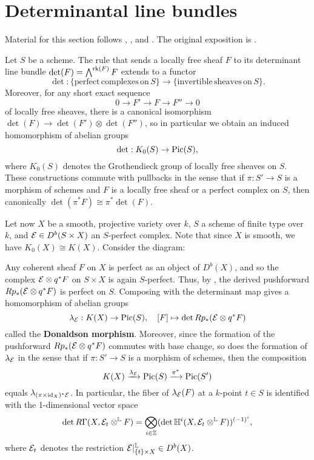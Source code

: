\section{Determinantal line bundles}\label{section:determinantal}
Material for this section follows \cite[\href{https://stacks.math.columbia.edu/tag/0FJI}{Tag 0FJI}]{stacks-project}, \cite[\href{https://stacks.math.columbia.edu/tag/0FJW}{Tag 0FJW}]{stacks-project}, and \cite[Section 8.1]{HL}. The original exposition is \cite{KM76}.

Let $S$ be a scheme. The rule that sends a locally free sheaf $F$ to its determinant line bundle $\det(F) = \bigwedge^{\operatorname{\mathrm{rk}}(F)} F$ extends to a functor
\[ \det: \{\mathrm{perfect\, complexes\, on\,} S\} \to \{\mathrm{invertible\,} \mathrm{sheaves\, on}\, S \}. \]
Moreover, for any short exact sequence
\[ 0 \to F' \to F \to F'' \to 0 \]
of locally free sheaves, there is a canonical isomorphism $\det(F) \to \det(F') \otimes \det(F'')$, so in particular we obtain an induced homomorphism of abelian groups
\[ \det: K_0(S) \to \mathrm{Pic}(S), \]
where $K_0(S)$ denotes the Grothendieck group of locally free sheaves on $S$. These constructions commute with pullbacks in the sense that if $\pi: S' \to S$ is a morphism of schemes and $F$ is a locally free sheaf or a perfect complex on $S$, then canonically $\det(\pi^* F) \cong \pi^*\det(F)$.

Let now $X$ be a smooth, projective variety over $k$, $S$ a scheme of finite type over $k$, and $\mathcal{E} \in D^b(S \times X)$ an $S$-perfect complex. Note that since $X$ is smooth, we have $K_0(X) \cong K(X)$. Consider the diagram:
\begin{center}
\end{center}
Any coherent sheaf $F$ on $X$ is perfect as an object of $D^b(X)$, and so the complex $\mathcal{E} \otimes q^*F$ on $S \times X$ is again $S$-perfect. Thus, by \cite[\href{https://stacks.math.columbia.edu/tag/0B91}{Tag 0B91}]{stacks-project}, the derived pushforward $R p_* (\mathcal{E} \otimes q^* F)$ is perfect on $S$. Composing with the determinant map gives a homomorphism of abelian groups
\[ \lambda_{\mathcal{E}}: K(X) \to \mathrm{Pic}(S), \quad [F] \mapsto \det R p_*(\mathcal{E} \otimes q^* F) \]
called the {\bf Donaldson morphism}. Moreover, since the formation of the pushforward $R p_*(\mathcal{E} \otimes q^* F)$ commutes with base change, so does the formation of $\lambda_{\mathcal{E}}$ in the sense that if $\pi: S' \to S$ is a morphism of schemes, then the composition
\[ K(X) \xrightarrow{\lambda_{\mathcal{E}}} \mathrm{Pic}(S) \xrightarrow{\pi^*} \mathrm{Pic}(S') \]
equals $\lambda_{(\pi \times \mathrm{id}_X)^* \mathcal{E}}$. In particular, the fiber of $\lambda_{\mathcal{E}}(F)$ at a $k$-point $t \in S$ is identified with the 1-dimensional vector space
\[ \det R \Gamma(X, \mathcal{E}_t \otimes^{\mathbb{L}} F) = \bigotimes_{i \in \mathbb{Z}} (\det \mathbb{H}^i(X, \mathcal{E}_t \otimes^{\mathbb{L}} F))^{(-1)^i}, \]
where $\mathcal{E}_t$ denotes the restriction $\mathcal{E}|^{\mathbb{L}}_{\{t\} \times X} \in D^b(X)$.

